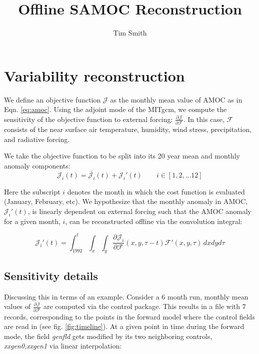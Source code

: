 \documentclass[a4paper,11pt]{article}
\title{\vspace{-10ex}Offline SAMOC Reconstruction}
\author{Tim Smith}
\date{\vspace{-3ex}}
\newcommand{\pderiv}[3][]{%
  \ensuremath{\frac{\partial^{#1} {#2}}{\partial {#3}^{#1}}}}
\begin{document}
\maketitle
  \section{Variability reconstruction}
  \label{linearSensitivity}
  
  We define an objective function $\mathcal{J}$ as the monthly mean value of AMOC as in Eqn. \ref{eq:amoc}. Using the adjoint mode of the MITgcm, we compute the sensitivity of the objective function to external forcing: $\pderiv{\mathcal{J}}{\mathcal{F}}$. In this case, $\mathcal{F}$ consists of the near surface air temperature, humidity, wind stress, precipitation, and radiative forcing.  
	
  We take the objective function to be split into its 20 year mean and monthly anomaly components: 
	\begin{equation}
	  \mathcal{J}_i(t) = \bar{\mathcal{J}_i}(t) + \mathcal{J}_i'(t) \qquad i \in [1, 2, ... 12]
	\end{equation}

  Here the subscript $i$ denotes the month in which the cost function is evaluated (January, February, etc). We hypothesize that the monthly anomaly in AMOC, $\mathcal{J}_i'(t)$, is linearly dependent on external forcing such that the AMOC anomaly for a given month, $i$, can be reconstructed offline via the convolution integral:
 
	\begin{equation}
	  \mathcal{J}_i'(t) = \int_{1992}^{t}\int_x \int_y\pderiv{\mathcal{J}_i}{\mathcal{F}}(x,y,\tau-t)\mathcal{F}'(x,y,\tau)\, dxdyd\tau  
	\end{equation}

  
  \subsection{Sensitivity details}
  
  Discussing this in terms of an example. Consider a 6 month run, monthly mean values of $\pderiv{\mathcal{J}}{\mathcal{F}}$ are computed via the control package. This results in a file with 7 records, corresponding to the points in the forward model where the control fields are read in (see fig. \ref{fig:timeline}). At a given point in time during the forward mode, the field \textit{genfld} gets modified by its two neighboring controls, \textit{xxgen0,xxgen1} via linear interpolation:
\end{document}

